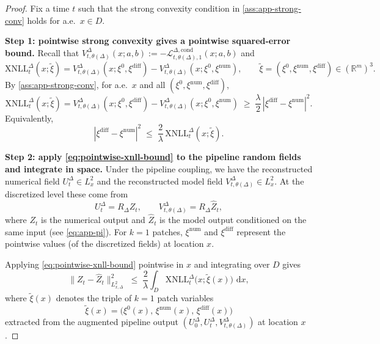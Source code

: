 \documentclass{article}
\numberwithin{equation}{section}
\theoremstyle{plain}
\theoremstyle{definition}
\theoremstyle{remark}
\newcommand{\R}{\mathbb{R}}
\newcommand{\dd}{\,\mathrm{d}}
\begin{document}
\begin{proof}
Fix a time $t$ such that the strong convexity condition in \cref{ass:app-strong-conv} holds for a.e.\ $x\in D$.

\smallskip
\noindent\textbf{Step 1: pointwise strong convexity gives a pointwise squared-error bound.}
Recall that $V^\Delta_{t,\theta(\Delta)}(x;a,b):=-\mathcal L^{\Delta,\mathrm{cond}}_{t,\theta(\Delta),1}(x;a,b)$ and
\[
\mathrm{XNLL}^\Delta_{t}(x;\widetilde\xi)
=
V^\Delta_{t,\theta(\Delta)}(x;\xi^0,\xi^{\mathrm{diff}})
-
V^\Delta_{t,\theta(\Delta)}(x;\xi^0,\xi^{\mathrm{num}}),
\qquad
\widetilde\xi=(\xi^0,\xi^{\mathrm{num}},\xi^{\mathrm{diff}})\in(\R^m)^3.
\]
By \cref{ass:app-strong-conv}, for a.e.\ $x$ and all $(\xi^0,\xi^{\mathrm{num}},\xi^{\mathrm{diff}})$,
\[
\mathrm{XNLL}^\Delta_{t}(x;\widetilde\xi)
=
V^\Delta_{t,\theta(\Delta)}(x;\xi^0,\xi^{\mathrm{diff}})
-
V^\Delta_{t,\theta(\Delta)}(x;\xi^0,\xi^{\mathrm{num}})
\;\ge\; \frac{\lambda}{2}\,|\xi^{\mathrm{diff}}-\xi^{\mathrm{num}}|^2.
\]
Equivalently,
\begin{equation}\label{eq:pointwise-xnll-bound}
|\xi^{\mathrm{diff}}-\xi^{\mathrm{num}}|^2 \;\le\; \frac{2}{\lambda}\,\mathrm{XNLL}^\Delta_{t}(x;\widetilde\xi).
\end{equation}

\smallskip
\noindent\textbf{Step 2: apply \eqref{eq:pointwise-xnll-bound} to the pipeline random fields and integrate in space.}
Under the pipeline coupling, we have the reconstructed numerical field $U_t^\Delta\in L^2_x$ and the reconstructed model
field $V_{t,\theta(\Delta)}^\Delta\in L^2_x$. At the discretized level these come from
\[
U_t^\Delta = R_\Delta Z_t, \qquad V_{t,\theta(\Delta)}^\Delta = R_\Delta \widehat Z_t,
\]
where $Z_t$ is the numerical output and $\widehat Z_t$ is the model output conditioned on the same input (see
\eqref{eq:app-pi}). For $k=1$ patches, $\xi^{\mathrm{num}}$ and $\xi^{\mathrm{diff}}$ represent the pointwise values
(of the discretized fields) at location $x$.

Applying \eqref{eq:pointwise-xnll-bound} pointwise in $x$ and integrating over $D$ gives
\begin{equation}\label{eq:disc-l2-from-xnll}
\|Z_t-\widehat Z_t\|_{L^2_{x,\Delta}}^2
\;\le\; \frac{2}{\lambda}\int_D \mathrm{XNLL}^\Delta_t\!\bigl(x;\widetilde\xi(x)\bigr)\,\dd x,
\end{equation}
where $\widetilde\xi(x)$ denotes the triple of $k=1$ patch variables
\[
\widetilde\xi(x) = \bigl(\xi^0(x),\,\xi^{\mathrm{num}}(x),\,\xi^{\mathrm{diff}}(x)\bigr)
\]
extracted from the augmented pipeline output $(U_0^\Delta,U_t^\Delta,V_{t,\theta(\Delta)}^\Delta)$ at location $x$.


\end{proof}
\end{document}
